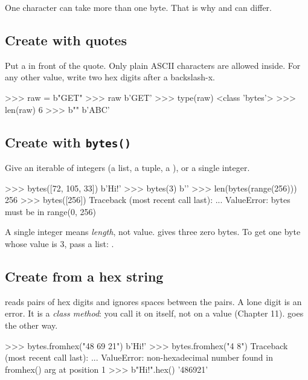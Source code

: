 One character can take more than one byte. That is why  and  can differ.

\subsection{Create with quotes}

Put a  in front of the quote. Only plain ASCII characters are allowed inside. For any other
value, write two hex digits after a backslash-x.

\begin{pycode}
>>> raw = b"GET\xff"
>>> raw
b'GET\xff'
>>> type(raw)
<class 'bytes'>
>>> len(raw)
6
>>> b""
b'ABC'
\end{pycode}

\subsection{Create with \texttt{bytes()}}

Give  an iterable of integers (a list, a tuple, a ), or a single integer.

\begin{pycode}
>>> bytes([72, 105, 33])
b'Hi!'
>>> bytes(3)
b''
>>> len(bytes(range(256)))
256
>>> bytes([256])
Traceback (most recent call last):
  ...
ValueError: bytes must be in range(0, 256)
\end{pycode}

\begin{trap}
A single integer means \emph{length}, not value.  gives three zero bytes. To get one byte
whose value is 3, pass a list: .
\end{trap}

\subsection{Create from a hex string}

 reads pairs of hex digits and ignores spaces between the pairs. A lone digit is an
error. It is a \emph{class method}: you call it on  itself, not on a value (Chapter 11).
 goes the other way.

\begin{pycode}
>>> bytes.fromhex("48 69 21")
b'Hi!'
>>> bytes.fromhex("4 8")
Traceback (most recent call last):
  ...
ValueError: non-hexadecimal number found in fromhex() arg at position 1
>>> b"Hi!".hex()
'486921'
\end{pycode}

